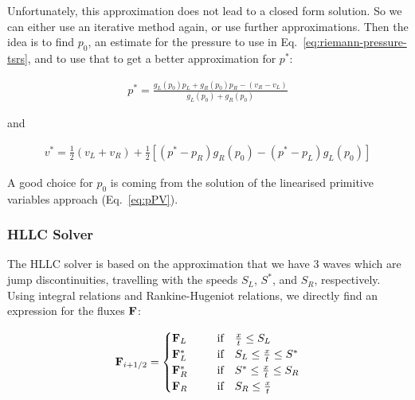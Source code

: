 Unfortunately, this approximation does not lead to a closed form solution. So
we can either use an iterative method again, or use further approximations.
Then the idea is to find $p_0$, an estimate for the pressure to use in
Eq.~\ref{eq:riemann-pressure-tsrs}, and to use that to get a better
approximation for $p^*$:

\begin{align}
p^* =
	\frac{
		g_L(p_0) p_L + g_R(p_0)p_R - (v_R - v_L)
	}{
		g_L(p_0) + g_R(p_0)
	}
	\label{eq:pstar-tsrs}
\end{align}

and

\begin{align}
v^*  =
	\frac{1}{2} (v_L + v_R) +
	\frac{1}{2}
	\left[
		(p^* - p_R) g_R(p_0) - (p^* - p_L) g_L(p_0)
	\right]
\end{align}


A good choice for $p_0$ is coming from the solution of the linearised
primitive variables approach (Eq.~\ref{eq:pPV}).











\subsubsection{HLLC Solver}\label{chap:riemann-hllc}


The HLLC solver is based on the approximation that we have 3 waves which are
jump discontinuities, travelling with the speeds $S_L$, $S^*$, and $S_R$,
respectively. Using integral relations and Rankine-Hugeniot relations, we
directly find an expression for the fluxes $\mathbf{F}$:


\begin{align}
\mathbf{F}_{i+1/2} = \begin{cases}
	\mathbf{F}_L ~~~~ &\text{ if }		~~	\frac{x}{t} \leq S_L \\
	\mathbf{F}^*_L ~~~~ &\text{ if }	~~  S_L \leq \frac{x}{t} \leq S^* \\
	\mathbf{F}^*_R ~~~~ &\text{ if }	~~	S^* \leq \frac{x}{t} \leq S_R \\
	\mathbf{F}_R ~~~~ &\text{ if }		~~	S_R \leq \frac{x}{t} \\
\end{cases}
\end{align}

